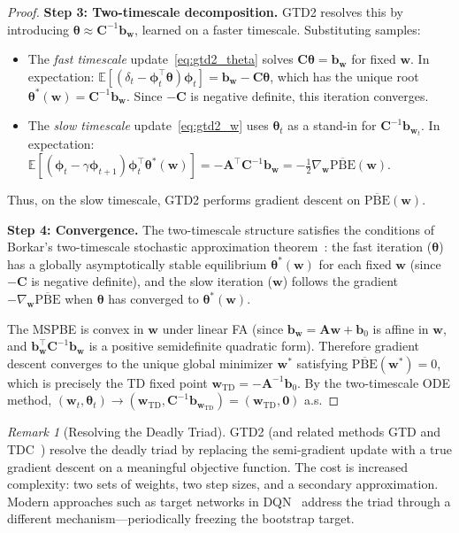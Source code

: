 \documentclass[11pt,a4paper]{article}
\theoremstyle{definition}
\theoremstyle{plain}
\theoremstyle{remark}
\newtheorem{remark}{Remark}[section]
\newcommand{\E}{\mathbb{E}}
\begin{document}
\begin{proof}
\textbf{Step 3: Two-timescale decomposition.} GTD2 resolves this by introducing $\bm{\theta} \approx \bm{C}^{-1}\bm{b}_{\bm{w}}$, learned on a faster timescale. Substituting samples:
\begin{itemize}[nosep]
    \item The \emph{fast timescale} update~\eqref{eq:gtd2_theta} solves $\bm{C}\bm{\theta} = \bm{b}_{\bm{w}}$ for fixed $\bm{w}$. In expectation: $\E[(\delta_t - \bm{\phi}_t^\top\bm{\theta})\bm{\phi}_t] = \bm{b}_{\bm{w}} - \bm{C}\bm{\theta}$, which has the unique root $\bm{\theta}^*(\bm{w}) = \bm{C}^{-1}\bm{b}_{\bm{w}}$. Since $-\bm{C}$ is negative definite, this iteration converges.
    \item The \emph{slow timescale} update~\eqref{eq:gtd2_w} uses $\bm{\theta}_t$ as a stand-in for $\bm{C}^{-1}\bm{b}_{\bm{w}_t}$. In expectation: $\E[(\bm{\phi}_t - \gamma\bm{\phi}_{t+1})\bm{\phi}_t^\top\bm{\theta}^*(\bm{w})] = -\bm{A}^\top\bm{C}^{-1}\bm{b}_{\bm{w}} = -\frac{1}{2}\nabla_{\bm{w}}\overline{\text{PBE}}(\bm{w})$.
\end{itemize}
Thus, on the slow timescale, GTD2 performs gradient descent on $\overline{\text{PBE}}(\bm{w})$.

\textbf{Step 4: Convergence.} The two-timescale structure satisfies the conditions of Borkar's two-timescale stochastic approximation theorem~\cite{borkar2000}: the fast iteration ($\bm{\theta}$) has a globally asymptotically stable equilibrium $\bm{\theta}^*(\bm{w})$ for each fixed $\bm{w}$ (since $-\bm{C}$ is negative definite), and the slow iteration ($\bm{w}$) follows the gradient $-\nabla_{\bm{w}}\overline{\text{PBE}}$ when $\bm{\theta}$ has converged to $\bm{\theta}^*(\bm{w})$.

The MSPBE is convex in $\bm{w}$ under linear FA (since $\bm{b}_{\bm{w}} = \bm{A}\bm{w}+\bm{b}_0$ is affine in $\bm{w}$, and $\bm{b}_{\bm{w}}^\top\bm{C}^{-1}\bm{b}_{\bm{w}}$ is a positive semidefinite quadratic form). Therefore gradient descent converges to the unique global minimizer $\bm{w}^*$ satisfying $\overline{\text{PBE}}(\bm{w}^*) = 0$, which is precisely the TD fixed point $\bm{w}_{\text{TD}} = -\bm{A}^{-1}\bm{b}_0$. By the two-timescale ODE method, $(\bm{w}_t, \bm{\theta}_t) \to (\bm{w}_{\text{TD}}, \bm{C}^{-1}\bm{b}_{\bm{w}_{\text{TD}}}) = (\bm{w}_{\text{TD}}, \bm{0})$ a.s.
\end{proof}

\begin{remark}[Resolving the Deadly Triad]
\label{rem:resolving_triad}
GTD2 (and related methods GTD and TDC~\cite{sutton2009}) resolve the deadly triad by replacing the semi-gradient update with a true gradient descent on a meaningful objective function. The cost is increased complexity: two sets of weights, two step sizes, and a secondary approximation. Modern approaches such as target networks in DQN~\cite{mnih2015} address the triad through a different mechanism---periodically freezing the bootstrap target.
\end{remark}
\end{document}
